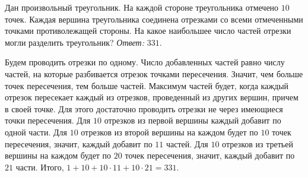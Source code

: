 \problem
Дан произвольный треугольник.
На каждой стороне треугольника отмечено $10$ точек.
Каждая вершина треугольника соединена отрезками со всеми отмеченными точками
противолежащей стороны.
На какое наибольшее число частей отрезки могли разделить треугольник?
\solution
\emph{Ответ:} $331$.
\par
Будем проводить отрезки по одному.
Число добавленных частей равно числу частей, на которые разбивается отрезок
точками пересечения.
Значит, чем больше точек пересечения, тем больше частей.
Максимум частей будет, когда каждый отрезок пересекает каждый из отрезков,
проведенный из других вершин, причем в своей точке.
Для этого достаточно проводить отрезки не через имеющиеся точки пересечения.
Для $10$ отрезков из первой вершины каждый добавит по одной части.
Для $10$ отрезков из второй вершины на каждом будет по $10$ точек пересечения,
значит, каждый добавит по $11$ частей.
Для $10$ отрезков из третьей вершины на каждом будет по $20$ точек пересечения,
значит, каждый добавит по $21$ части.
Итого, $1 + 10 + 10 \cdot 11 + 10 \cdot 21 = 331$.
\endproblem
